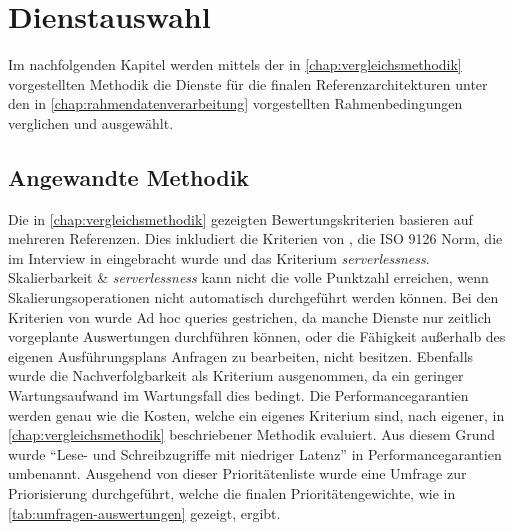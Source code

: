 \chapter{Dienstauswahl}\label{chapter:Dienstauswah}
Im nachfolgenden Kapitel werden mittels der in \autoref{chap:vergleichsmethodik} vorgestellten Methodik die Dienste für die finalen Referenzarchitekturen unter den in \autoref{chap:rahmendatenverarbeitung} vorgestellten Rahmenbedingungen verglichen und ausgewählt.

\section{Angewandte Methodik}\label{section:Angewandte-Methodi}
Die  in \autoref{chap:vergleichsmethodik} gezeigten Bewertungskriterien basieren auf mehreren Referenzen. Dies inkludiert die Kriterien von \citeauthor{Marz.2015}, die ISO 9126 Norm, die im Interview in  eingebracht wurde und das Kriterium \textit{serverlessness}. Skalierbarkeit \& \textit{serverlessness} kann nicht die volle Punktzahl erreichen, wenn Skalierungsoperationen nicht automatisch durchgeführt werden können. Bei den Kriterien von \citeauthor{Marz.2015} wurde Ad hoc queries gestrichen, da manche Dienste nur zeitlich vorgeplante Auswertungen durchführen können, oder die Fähigkeit außerhalb des eigenen Ausführungsplans Anfragen zu bearbeiten, nicht besitzen. Ebenfalls wurde die Nachverfolgbarkeit als Kriterium ausgenommen, da ein geringer Wartungsaufwand im Wartungsfall dies bedingt. Die Performancegarantien werden genau wie die Kosten, welche ein eigenes Kriterium sind, nach eigener, in \autoref{chap:vergleichsmethodik} beschriebener Methodik evaluiert. Aus diesem Grund wurde \enquote{Lese- und Schreibzugriffe mit niedriger Latenz} in Performancegarantien umbenannt. Ausgehend von dieser Prioritätenliste wurde eine Umfrage zur Priorisierung durchgeführt, welche die finalen Prioritätengewichte, wie in \autoref{tab:umfragen-auswertungen} gezeigt, ergibt. 

